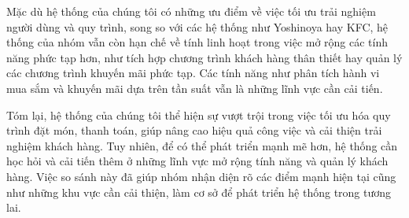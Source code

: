Mặc dù hệ thống của chúng tôi có những ưu điểm về việc tối ưu trải nghiệm người dùng và quy trình, song so với các hệ thống như Yoshinoya hay KFC, hệ thống của nhóm vẫn còn hạn chế về tính linh hoạt trong việc mở rộng các tính năng phức tạp hơn, như tích hợp chương trình khách hàng thân thiết hay quản lý các chương trình khuyến mãi phức tạp. Các tính năng như phân tích hành vi mua sắm và khuyến mãi dựa trên tần suất vẫn là những lĩnh vực cần cải tiến.

Tóm lại, hệ thống của chúng tôi thể hiện sự vượt trội trong việc tối ưu hóa quy trình đặt món, thanh toán, giúp nâng cao hiệu quả công việc và cải thiện trải nghiệm khách hàng. Tuy nhiên, để có thể phát triển mạnh mẽ hơn, hệ thống cần học hỏi và cải tiến thêm ở những lĩnh vực mở rộng tính năng và quản lý khách hàng. Việc so sánh này đã giúp nhóm nhận diện rõ các điểm mạnh hiện tại cũng như những khu vực cần cải thiện, làm cơ sở để phát triển hệ thống trong tương lai.




